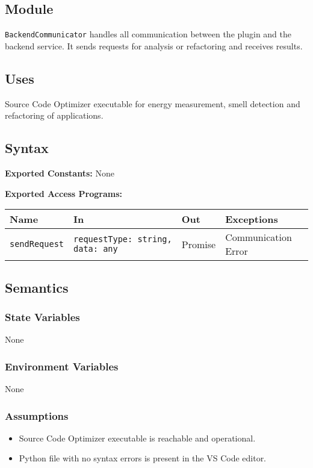 \documentclass[12pt, titlepage]{article}
\begin{document}
\subsection{Module}
\texttt{BackendCommunicator} handles all communication between the plugin and the backend service. It sends requests for analysis or refactoring and receives results.

\subsection{Uses}
Source Code Optimizer executable for energy measurement, smell detection and refactoring of applications.

\subsection{Syntax}

\textbf{Exported Constants:} None

\noindent \textbf{Exported Access Programs:}\\
\begin{tabularx}{\linewidth}{|l|>{\raggedright\arraybackslash}X|l|l|}
  \hline
  \textbf{Name} & \textbf{In} & \textbf{Out} & \textbf{Exceptions} \\
  \hline
  \texttt{sendRequest} & \texttt{requestType: string, data: any} & Promise & Communication Error \\
  \hline
\end{tabularx}


\subsection{Semantics}

\subsubsection{State Variables}
None

\subsubsection{Environment Variables}
None

\subsubsection{Assumptions}
\begin{itemize}
\item Source Code Optimizer executable is reachable and operational.
\item Python file with no syntax errors is present in the VS Code editor.
\end{itemize}
\end{document}
